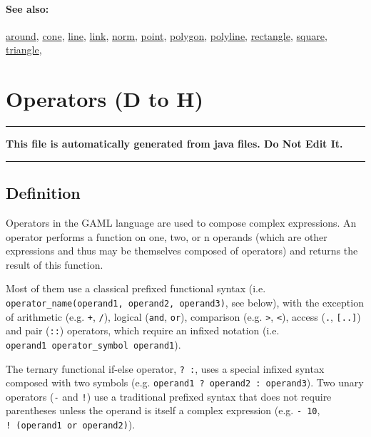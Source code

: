 \documentclass[]{book}
\theoremstyle{definition}
\theoremstyle{definition}
\theoremstyle{definition}
\theoremstyle{remark}
\begin{document}
\subsubsection{See also:}\label{see-also-75}

\href{OperatorsAA\#around}{around}, \href{OperatorsBC\#cone}{cone},
\href{OperatorsIM\#line}{line}, \href{OperatorsIM\#link}{link},
\href{OperatorsNR\#norm}{norm}, \href{OperatorsNR\#point}{point},
\href{OperatorsNR\#polygon}{polygon},
\href{OperatorsNR\#polyline}{polyline},
\href{OperatorsNR\#rectangle}{rectangle},
\href{OperatorsSZ\#square}{square},
\href{OperatorsSZ\#triangle}{triangle},

\chapter{Operators (D to H)}\label{operators-d-to-h}

\begin{center}\rule{0.5\linewidth}{\linethickness}\end{center}

\textbf{This file is automatically generated from java files. Do Not
Edit It.}

\begin{center}\rule{0.5\linewidth}{\linethickness}\end{center}

\section{Definition}\label{definition-2}

Operators in the GAML language are used to compose complex expressions.
An operator performs a function on one, two, or n operands (which are
other expressions and thus may be themselves composed of operators) and
returns the result of this function.

Most of them use a classical prefixed functional syntax (i.e.
\texttt{operator\_name(operand1,\ operand2,\ operand3)}, see below),
with the exception of arithmetic (e.g. \texttt{+}, \texttt{/}), logical
(\texttt{and}, \texttt{or}), comparison (e.g. \texttt{\textgreater{}},
\texttt{\textless{}}), access (\texttt{.}, \texttt{{[}..{]}}) and pair
(\texttt{::}) operators, which require an infixed notation (i.e.
\texttt{operand1\ operator\_symbol\ operand1}).

The ternary functional if-else operator, \texttt{?\ :}, uses a special
infixed syntax composed with two symbols (e.g.
\texttt{operand1\ ?\ operand2\ :\ operand3}). Two unary operators
(\texttt{-} and \texttt{!}) use a traditional prefixed syntax that does
not require parentheses unless the operand is itself a complex
expression (e.g. \texttt{-\ 10}, \texttt{!\ (operand1\ or\ operand2)}).
\end{document}
